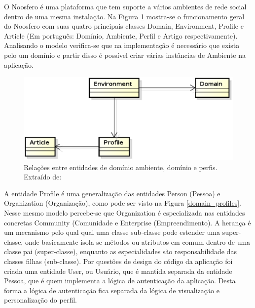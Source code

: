 
O Noosfero é uma plataforma que tem suporte a vários ambientes de rede social dentro de uma mesma instalação. Na Figura \ref{domain_main} mostra-se o funcionamento geral do Noosfero com suas quatro principais classes Domain, Environment, Profile e Article (Em português: Domínio, Ambiente, Perfil e Artigo respectivamente). Analisando o modelo verifica-se que na implementação é necessário que exista pelo um domínio e partir disso é possível criar várias instâncias de Ambiente na aplicação.

\begin{figure}[h]
    \centering
    \includegraphics[keepaspectratio=true,scale=0.65]
      {figuras/domain_main.eps}
    \caption{Relações entre entidades de domínio ambiente, domínio e perfis. Extraído de: \cite{bucher2014rede}}
    \label{domain_main}
\end{figure}

A entidade Profile é uma generalização das entidades Person (Pessoa) e Organization (Organização), como pode ser visto na Figura \ref{domain_profiles}. Nesse mesmo modelo percebe-se que Organization é especializada nas entidades concretas Community (Comunidade e Enterprise (Empreendimento). A herança é um mecanismo pelo qual qual uma classe sub-classe pode estender uma super-classe, onde basicamente isola-se métodos ou atributos em comum dentro de uma classe pai (super-classe), enquanto as especialidades são responsabilidade das classes filhas (sub-classe).
Por questões de design do código da aplicação foi criada uma entidade User, ou Usuário, que é mantida separada da entidade Pessoa, que é quem implementa a lógica de autenticação da aplicação. Desta forma a lógica de autenticação fica separada da lógica de visualização e personalização do perfil.

